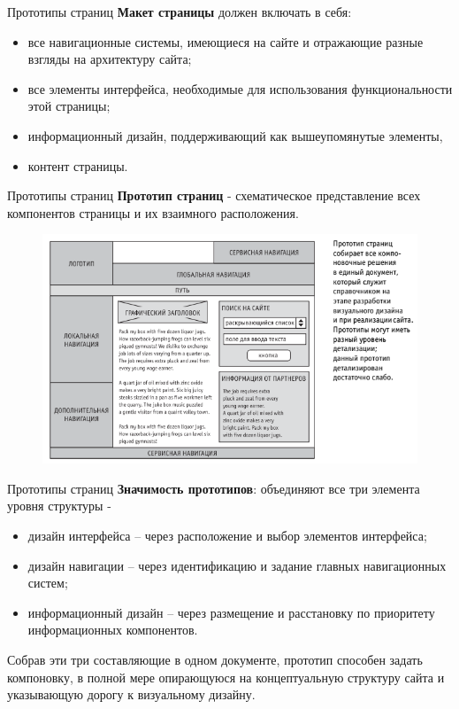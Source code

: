 \documentclass{beamer}
\begin{document}
\begin{frame}[t]{Прототипы страниц}
\textbf{Макет страницы }должен включать в себя:
\begin{itemize}
\item все навигационные системы, имеющиеся на сайте и отражающие разные взгляды на архитектуру сайта; 
\item все элементы интерфейса, необходимые для использования функциональности этой страницы; 
\item информационный дизайн, поддерживающий как вышеупомянутые элементы, 
\item контент страницы.
\end{itemize}
\end{frame}

\begin{frame}[t]{Прототипы страниц}
\textbf{Прототип страниц }- схематическое представление всех компонентов страницы и их взаимного
расположения.
\begin{figure}[h]
\centering
\includegraphics[scale=0.6]{images/lec04-pic21.png}
\end{figure}
\end{frame}

\begin{frame}[t]{Прототипы страниц}
\textbf{Значимость прототипов}: объединяют все три элемента уровня структуры -
\begin{itemize}
\item дизайн интерфейса – через расположение и выбор элементов
интерфейса; 
\item дизайн навигации – через идентификацию и задание главных навигационных систем;
\item информационный дизайн – через размещение и расстановку по приоритету информационных компонентов. 
\end{itemize}
Собрав эти три составляющие в одном документе, прототип способен задать компоновку, в полной мере опирающуюся на концептуальную структуру сайта и указывающую дорогу к визуальному дизайну.
\end{frame}
\end{document}
